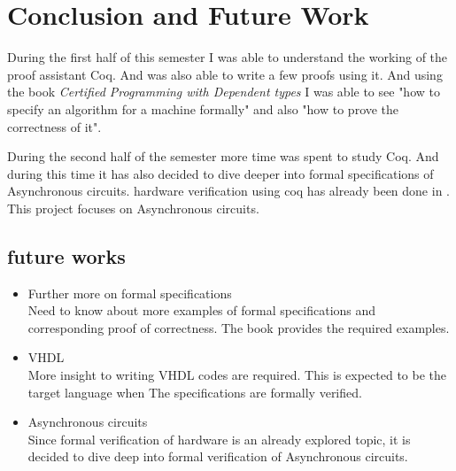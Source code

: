 \chapter{Conclusion and Future Work}

\par During the first half of this semester I was able to understand the working of the proof assistant Coq.
And was also able to write a few proofs using it. And using the book \textit{Certified Programming with
Dependent types} I was able to see "how to specify an algorithm for a machine formally" and also "how to
prove the correctness of it".
\par During the second half of the semester more time was spent to study Coq. And during this time it 
has also decided to dive deeper into formal specifications of Asynchronous circuits.
hardware verification using coq has already been done in \cite{kami} . This project focuses on
Asynchronous circuits.

\section{future works}

\begin{itemize}
    \item Further more on formal specifications\\
        Need to know about more examples of formal specifications and corresponding proof of correctness.
        The book provides the required examples.
    \item VHDL\\
        More insight to writing VHDL codes are required. This is expected to be the target language when
        The specifications are formally verified.
    \item Asynchronous circuits\\
        Since formal verification of hardware is an already explored topic, it is decided to dive deep 
        into formal verification of Asynchronous circuits.
\end{itemize}

